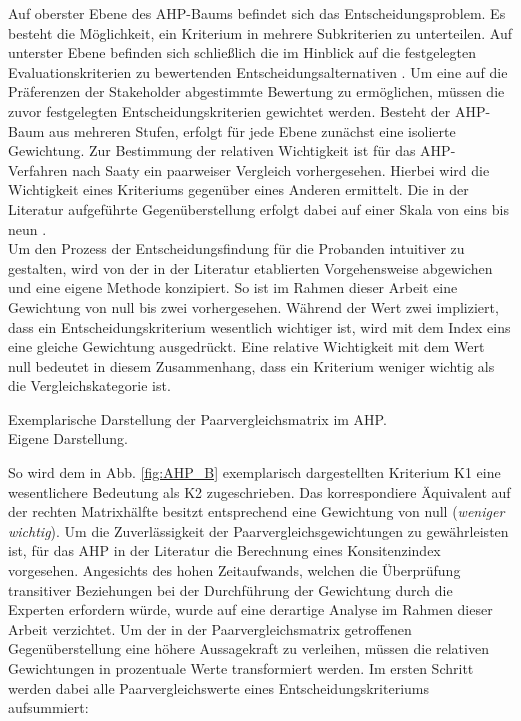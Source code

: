 Auf oberster Ebene des AHP-Baums befindet sich das Entscheidungsproblem. Es besteht die Möglichkeit, ein Kriterium in mehrere Subkriterien zu unterteilen. Auf unterster Ebene befinden sich schließlich die im Hinblick auf die festgelegten Evaluationskriterien zu bewertenden Entscheidungsalternativen \cite[86]{Saaty.2008}. Um eine auf die Präferenzen der Stakeholder abgestimmte Bewertung zu ermöglichen, müssen die zuvor festgelegten Entscheidungskriterien gewichtet werden. Besteht der AHP-Baum aus mehreren Stufen, erfolgt für jede Ebene zunächst eine isolierte Gewichtung. Zur Bestimmung der relativen Wichtigkeit ist für das AHP-Verfahren nach Saaty ein paarweiser Vergleich vorhergesehen. Hierbei wird die Wichtigkeit eines Kriteriums gegenüber eines Anderen ermittelt. Die in der Literatur aufgeführte Gegenüberstellung erfolgt dabei auf einer Skala von eins bis neun \cite[86]{Saaty.2008}.\\ Um den Prozess der Entscheidungsfindung für die Probanden intuitiver zu gestalten, wird von der in der Literatur etablierten Vorgehensweise abgewichen und eine eigene Methode konzipiert. So ist im Rahmen dieser Arbeit eine Gewichtung von null bis zwei vorhergesehen. Während der Wert zwei impliziert, dass ein Entscheidungskriterium wesentlich wichtiger ist, wird mit dem Index eins eine gleiche Gewichtung ausgedrückt. Eine relative Wichtigkeit mit dem Wert null bedeutet in diesem Zusammenhang, dass ein Kriterium weniger wichtig als die Vergleichskategorie ist.  
\begin{center}
	\begin{table}[H]
		\centering
		\caption[Exemplarische Darstellung der Paarvergleichsmatrix im AHP]{Exemplarische Darstellung der Paarvergleichsmatrix im AHP.\\ Eigene Darstellung.}
		\label{fig:AHP_B}
	\end{table}
\end{center}
\vspace*{-15mm}
So wird dem in Abb. \ref{fig:AHP_B} exemplarisch dargestellten Kriterium K1 eine wesentlichere Bedeutung als K2 zugeschrieben. Das korrespondiere Äquivalent auf der rechten Matrixhälfte besitzt entsprechend eine Gewichtung von null (\textit{weniger wichtig}). Um die Zuverlässigkeit der Paarvergleichsgewichtungen zu gewährleisten ist, für das AHP in der Literatur die Berechnung eines Konsitenzindex vorgesehen. Angesichts des hohen Zeitaufwands, welchen die Überprüfung transitiver Beziehungen bei der Durchführung der Gewichtung durch die Experten erfordern würde, wurde auf eine derartige Analyse im Rahmen dieser Arbeit verzichtet. Um der in der Paarvergleichsmatrix getroffenen Gegenüberstellung eine höhere Aussagekraft zu verleihen, müssen die relativen Gewichtungen in prozentuale Werte transformiert werden. Im ersten Schritt werden dabei alle Paarvergleichswerte eines Entscheidungskriteriums aufsummiert:\\
